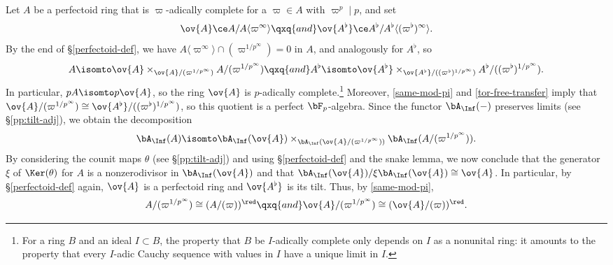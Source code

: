  \label{perfectoid-structure}
Let $A$ be a perfectoid ring that is $\varpi$-adically complete for a $\varpi \in A$ with $\varpi^p \mid p$, and set
\[
\ov{A} \ce A/A\langle\varpi^\infty\rangle \qxq{and} \ov{A^\flat} \ce A^\flat/A^\flat\langle(\varpi^\flat)^\infty\rangle.
\]
By the end of \S\ref{perfectoid-def}, we have $A\langle \varpi^\infty \rangle \cap (\varpi^{1/p^\infty}) = 0$ in $A$, and analogously for $A^\flat$, so
\[
A \isomto \ov{A} \times_{\ov{A}/(\varpi^{1/p^\infty})} A/(\varpi^{1/p^\infty}) \qxq{and} A^\flat \isomto \ov{A^\flat} \times_{\ov{A^\flat}/((\varpi^\flat)^{1/p^\infty})} A^\flat/((\varpi^\flat)^{1/p^\infty}).
\]
In particular, $pA \isomto p\ov{A}$, so the ring $\ov{A}$ is $p$-adically complete.\footnote{For a ring $B$ and an ideal $I \subset B$, the property that $B$ be $I$-adically complete only depends on $I$ as a nonunital ring: it amounts to the property that every $I$-adic Cauchy sequence with values in $I$ have a unique limit in $I$.} Moreover, \eqref{same-mod-pi} and \eqref{tor-free-transfer} imply that $\ov{A}/(\varpi^{1/p^\infty}) \cong \ov{A^\flat}/((\varpi^\flat)^{1/p^\infty})$, so this quotient is a perfect $\bF_p$-algebra.  Since the functor $\bA_\Inf(-)$ preserves limits (see \S\ref{pp:tilt-adj}), we obtain the decomposition
\[
\bA_\Inf(A) \isomto \bA_\Inf(\ov{A}) \times_{\bA_\Inf(\ov{A}/(\varpi^{1/p^\infty}))} \bA_\Inf(A/(\varpi^{1/p^\infty})).
\]
By considering the counit maps $\theta$ (see \S\ref{pp:tilt-adj}) and using \S\ref{perfectoid-def} and the snake lemma, we now conclude that the generator $\xi$ of $\Ker(\theta)$ for $A$ is a nonzerodivisor in $\bA_\Inf(\ov{A})$ and that $\bA_\Inf(\ov{A})/\xi\bA_\Inf(\ov{A}) \cong \ov{A}$. In particular, by \S\ref{perfectoid-def} again, $\ov{A}$ is a perfectoid ring and $\ov{A^\flat}$ is its tilt. Thus, by \eqref{same-mod-pi},
\[
A/(\varpi^{1/p^\infty}) %
\cong (A/(\varpi))^\red \qxq{and} \ov{A}/(\varpi^{1/p^\infty}) %
\cong (\ov{A}/(\varpi))^\red.
\]
